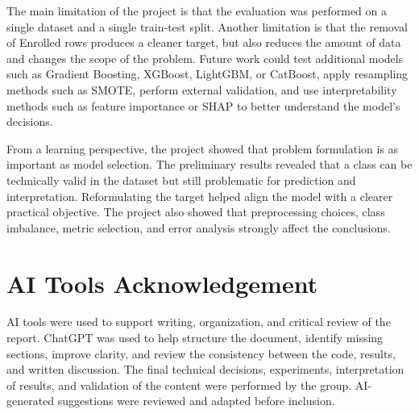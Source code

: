 \documentclass[lettersize,journal]{IEEEtran}
\begin{document}
The main limitation of the project is that the evaluation was performed on a single dataset and a single train-test split. Another limitation is that the removal of Enrolled rows produces a cleaner target, but also reduces the amount of data and changes the scope of the problem. Future work could test additional models such as Gradient Boosting, XGBoost, LightGBM, or CatBoost, apply resampling methods such as SMOTE, perform external validation, and use interpretability methods such as feature importance or SHAP to better understand the model's decisions.

From a learning perspective, the project showed that problem formulation is as important as model selection. The preliminary results revealed that a class can be technically valid in the dataset but still problematic for prediction and interpretation. Reformulating the target helped align the model with a clearer practical objective. The project also showed that preprocessing choices, class imbalance, metric selection, and error analysis strongly affect the conclusions.

\section*{AI Tools Acknowledgement}
AI tools were used to support writing, organization, and critical review of the report. ChatGPT was used to help structure the document, identify missing sections, improve clarity, and review the consistency between the code, results, and written discussion. The final technical decisions, experiments, interpretation of results, and validation of the content were performed by the group. AI-generated suggestions were reviewed and adapted before inclusion.
\end{document}
